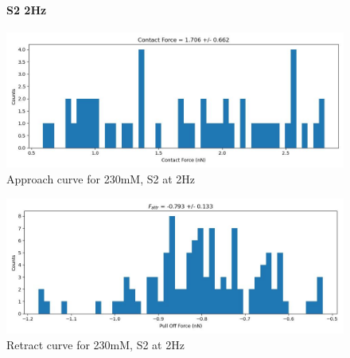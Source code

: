 \newpage


\begin{figure}[h!]
\paragraph{S2 2Hz}
\centering
\includegraphics[width=\textwidth]{chapter7/Tip speed/230mM/S2 2Hz/approach_f_c_hist.jpg}
\caption{Approach curve for 230mM, S2 at 2Hz}
\end{figure}

\begin{figure}[h!]
\centering
\includegraphics[width=\textwidth]{chapter7/Tip speed/230mM/S2 2Hz/retract_f_a_hist.jpg}
\caption{Retract curve for 230mM, S2 at 2Hz}
\end{figure}

\newpage

